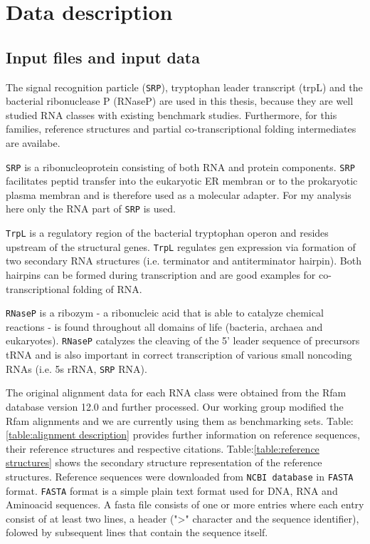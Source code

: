 \documentclass[ twoside,openright,titlepage,numbers=noenddot,headinclude,%
                footinclude=false, cleardoublepage=empty,abstractoff, %
                BCOR=5mm,paper=a4,fontsize=11pt,%
                ngerman,american,%
                ]{scrreprt}
\begin{document}
\section{Data description} \label{data description}

\subsection{Input files and input data}


The signal recognition particle (\texttt{SRP})\cite{SRP}, tryptophan leader
transcript (trpL)\cite{sourceRefTRP} and the bacterial ribonuclease P
(RNaseP)\cite{RNAseP} are used in this thesis, because they are well studied RNA classes with existing benchmark studies. Furthermore, for this families, reference structures and partial co-transcriptional folding intermediates are availabe.

\texttt{SRP} is a ribonucleoprotein consisting of both RNA and protein
components. \texttt{SRP} facilitates peptid transfer into the eukaryotic ER membran
or to the prokaryotic plasma membran and is therefore used as a molecular
adapter. For my analysis here only the RNA part of \texttt{SRP} is used.

  
\texttt{TrpL} is a regulatory region of the bacterial tryptophan operon and resides
upstream of the structural genes.
\texttt{TrpL} regulates gen expression via formation of two secondary RNA structures (i.e. terminator and antiterminator hairpin). Both hairpins can be formed during transcription and are good examples for co-transcriptional folding of RNA. 


\texttt{RNaseP} is a ribozym - a ribonucleic acid that is able to catalyze chemical
reactions - is found throughout all domains of life (bacteria, archaea and
eukaryotes). \texttt{RNaseP} catalyzes the cleaving of the 5' leader sequence of precursors tRNA and is also important in correct transcription of various small noncoding RNAs (i.e. 5s rRNA, \texttt{SRP} RNA). 



The original alignment data for each RNA class were obtained from the
Rfam\cite{Rfam} database version 12.0 and further processed\cite{Meyer}. Our working
group modified the Rfam alignments and we are currently using them as
benchmarking sets. 
Table:\ref{table:alignment description} provides further information on
reference sequences, their reference structures and respective
citations. Table:\ref{table:reference structures} shows the secondary structure representation of the reference structures. Reference sequences were downloaded from \texttt{NCBI database} in \texttt{FASTA} format. 
\texttt{FASTA} format is a simple plain text format used for DNA, RNA and
Aminoacid sequences. A fasta file consists of one or more entries where
each entry consist of at least two lines, a header (">" character and the sequence
identifier), folowed by subsequent lines that contain the sequence itself.
\end{document}
